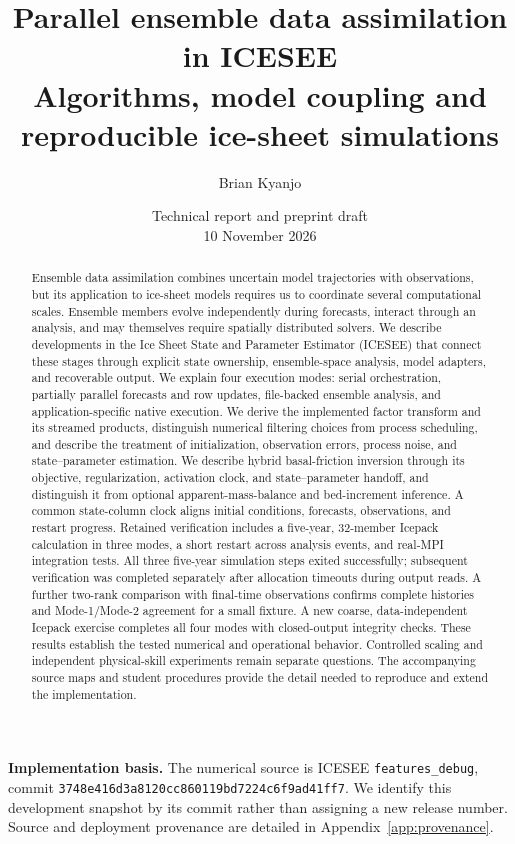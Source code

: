 \documentclass[11pt,a4paper]{article}
\title{Parallel ensemble data assimilation in ICESEE\\Algorithms, model coupling and reproducible ice-sheet simulations}
\author{Brian Kyanjo}
\date{Technical report and preprint draft\\10 November 2026}
\newcommand{\code}[1]{\nolinkurl{#1}}
\begin{document}
\maketitle
\begin{abstract}
Ensemble data assimilation combines uncertain model trajectories with observations, but its application to ice-sheet models requires us to coordinate several computational scales. Ensemble members evolve independently during forecasts, interact through an analysis, and may themselves require spatially distributed solvers. We describe developments in the Ice Sheet State and Parameter Estimator (ICESEE) that connect these stages through explicit state ownership, ensemble-space analysis, model adapters, and recoverable output. We explain four execution modes: serial orchestration, partially parallel forecasts and row updates, file-backed ensemble analysis, and application-specific native execution. We derive the implemented factor transform and its streamed products, distinguish numerical filtering choices from process scheduling, and describe the treatment of initialization, observation errors, process noise, and state--parameter estimation. We describe hybrid basal-friction inversion through its objective, regularization, activation clock, and state--parameter handoff, and distinguish it from optional apparent-mass-balance and bed-increment inference. A common state-column clock aligns initial conditions, forecasts, observations, and restart progress. Retained verification includes a five-year, 32-member Icepack calculation in three modes, a short restart across analysis events, and real-MPI integration tests. All three five-year simulation steps exited successfully; subsequent verification was completed separately after allocation timeouts during output reads. A further two-rank comparison with final-time observations confirms complete histories and Mode-1/Mode-2 agreement for a small fixture. A new coarse, data-independent Icepack exercise completes all four modes with closed-output integrity checks. These results establish the tested numerical and operational behavior. Controlled scaling and independent physical-skill experiments remain separate questions. The accompanying source maps and student procedures provide the detail needed to reproduce and extend the implementation.
\end{abstract}
\noindent\textbf{Implementation basis.} The numerical source is ICESEE \code{features_debug}, commit \code{3748e416d3a8120cc860119bd7224c6f9ad41ff7}. We identify this development snapshot by its commit rather than assigning a new release number. Source and deployment provenance are detailed in Appendix~\ref{app:provenance}.
\newpage
\setcounter{tocdepth}{1}
\tableofcontents
\newpage
\end{document}
